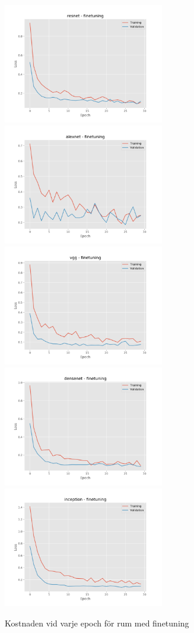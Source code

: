 \documentclass[]{kththesis}
\begin{document}
  \begin{figure}[h]
    \includegraphics[width=7cm]{r_l_resnet_fine}
    \includegraphics[width=7cm]{r_l_alexnet_fine}
    \includegraphics[width=7cm]{r_l_vgg_fine}
    \includegraphics[width=7cm]{r_l_densenet_fine}
    \includegraphics[width=7cm]{r_l_inception_fine}
    \caption{Kostnaden vid varje epoch för rum med finetuning}
    \label{fig:r_l_2}
  \end{figure}
  
\end{document}
